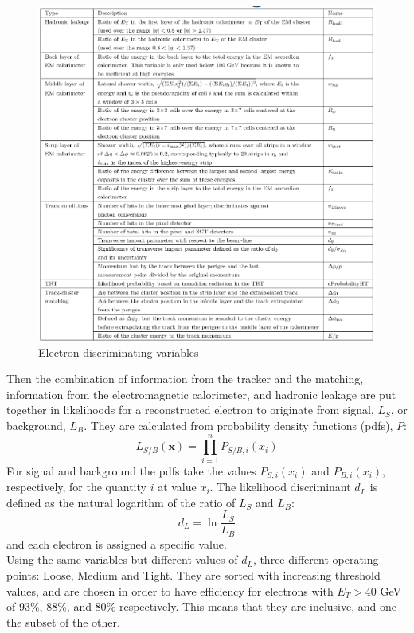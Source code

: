 \documentclass[a4paper, oneside]{book}
\begin{document}
			\begin{figure}
				\centering
				\includegraphics[width=0.45\textheight]{tesi_images/el_discr.png}
				\caption{Electron discriminating variables}
				\label{fig:el_discr}
			\end{figure}
			Then the combination of information from the tracker and the matching, information from the electromagnetic calorimeter, and hadronic leakage  are put together in likelihoods for a reconstructed electron to originate from signal,
			$L_S$, or background, $L_B$. They are calculated from probability density functions (pdfs), $P$:
			$$
			L_{S/B}(\textbf{x}) = \prod_{i=1}^{n}P_{S/B,i}(x_i)
			$$
			For signal and background the pdfs take the values $P_{S,i}(x_i)$ and $P_{B,i}(x_i)$, respectively, for the quantity $i$ at value $x_i$. The likelihood discriminant $d_L$ is defined as the natural logarithm of the ratio of $L_S$ and $L_B$:
			$$
			d_L = \ln{\frac{L_S}{L_B}}
			$$
			and each electron is assigned a specific value.\\
			Using the same variables but different values of $d_L$, three different operating points: Loose, Medium and Tight. They are sorted with increasing threshold values, and are chosen in order to have efficiency for electrons with $E_T > 40$ GeV of 93\%, 88\%, and 80\% respectively. This means that they are inclusive, and one the subset of the other.
			
\end{document}
